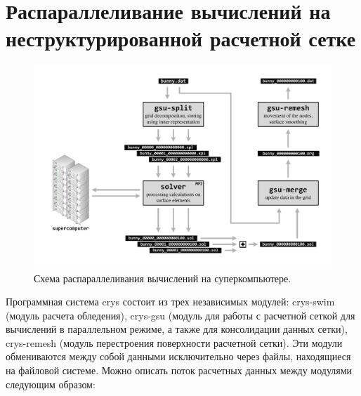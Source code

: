 \documentclass[
11pt,%
tightenlines,%
twoside,%
onecolumn,%
nofloats,%
nobibnotes,%
nofootinbib,%
superscriptaddress,%
noshowpacs,%
centertags]%
{revtex4}
\begin{document}
\section{Распараллеливание вычислений на неструктурированной расчетной сетке}

\begin{figure}[h]
\includegraphics[width=1.0\textwidth]{pics/02-scheme.pdf}
\caption{Схема распараллеливания вычислений на суперкомпьютере.}\label{fig:02-scheme}
\end{figure}

Программная система crys состоит из трех независимых модулей: crys-swim (модуль расчета обледения), crys-gsu (модуль для работы с расчетной сеткой для вычислений в параллельном режиме, а также для консолидации данных сетки), crys-remesh (модуль перестроения поверхности расчетной сетки). Эти модули обмениваются между собой данными исключительно через файлы, находящиеся на файловой системе.
Можно описать поток расчетных данных между модулями следующим образом:
\end{document}
